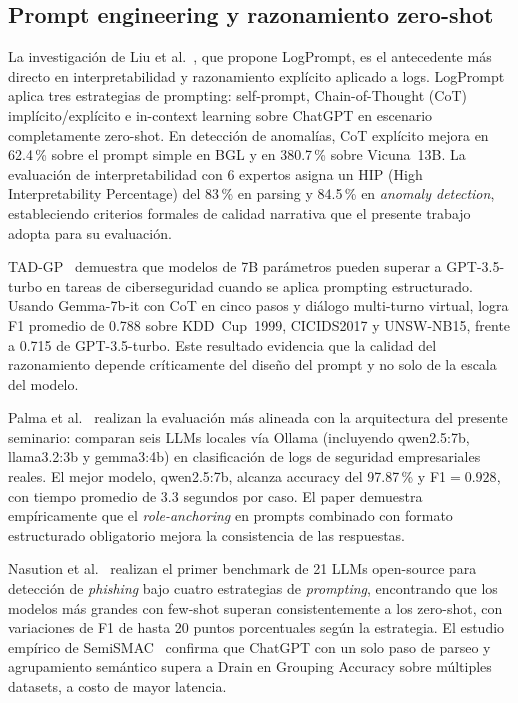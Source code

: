 \subsection{Prompt engineering y razonamiento zero-shot}

La investigación de Liu et al.~\cite{liu2024logprompt}, que propone
LogPrompt, es el antecedente más directo en interpretabilidad y
razonamiento explícito aplicado a logs. LogPrompt aplica tres
estrategias de prompting: self-prompt, Chain-of-Thought (CoT)
implícito/explícito e in-context learning sobre ChatGPT en escenario
completamente zero-shot. En detección de anomalías, CoT explícito
mejora en 62.4\,\% sobre el prompt simple en BGL y en 380.7\,\% sobre
Vicuna~13B. La evaluación de interpretabilidad con 6 expertos asigna
un HIP (High Interpretability Percentage) del 83\,\% en parsing y
84.5\,\% en \textit{anomaly detection}, estableciendo criterios formales de
calidad narrativa que el presente trabajo adopta para su evaluación.

TAD-GP~\cite{zhao2025tadgp} demuestra que modelos de 7B parámetros
pueden superar a GPT-3.5-turbo en tareas de ciberseguridad cuando se
aplica prompting estructurado. Usando Gemma-7b-it con CoT en cinco
pasos y diálogo multi-turno virtual, logra F1 promedio de 0.788 sobre
KDD~Cup~1999, CICIDS2017 y UNSW-NB15, frente a 0.715 de GPT-3.5-turbo.
Este resultado evidencia que la calidad del razonamiento depende
críticamente del diseño del prompt y no solo de la escala del modelo.

Palma et al.~\cite{palma2025llm} realizan la evaluación más alineada
con la arquitectura del presente seminario: comparan seis LLMs locales
vía Ollama (incluyendo qwen2.5:7b, llama3.2:3b y gemma3:4b) en
clasificación de logs de seguridad empresariales reales. El mejor
modelo, qwen2.5:7b, alcanza accuracy del 97.87\,\% y F1$=0.928$, con
tiempo promedio de 3.3 segundos por caso. El paper demuestra
empíricamente que el \textit{role-anchoring} en prompts combinado con
formato estructurado obligatorio mejora la consistencia de las
respuestas.

Nasution et al.~\cite{nasution2025phishing} realizan el primer benchmark
de 21 LLMs open-source para detección de \textit{phishing} bajo cuatro estrategias
de \textit{prompting}, encontrando que los modelos más grandes con few-shot
superan consistentemente a los zero-shot, con variaciones de F1 de
hasta 20 puntos porcentuales según la estrategia. El estudio empírico de
SemiSMAC~\cite{sun2024semismac} confirma que ChatGPT con un solo paso
de parseo y agrupamiento semántico supera a Drain en Grouping Accuracy
sobre múltiples datasets, a costo de mayor latencia.

